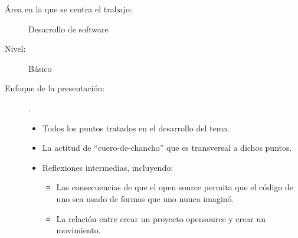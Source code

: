 \begin{description}
 \item[Área en la que se centra el trabajo:] Desarrollo de software
 \item[Nivel:] Básico
 \item[Enfoque de la presentación:] .\\
  \begin{itemize}
   \item Todos los puntos tratados en el desarrollo del tema.
   \item La actitud de ``cuero-de-chancho'' que es transversal a dichos puntos.
   \item Reflexiones intermedias, incluyendo:
     \begin{itemize}
     \item Las consecuencias de que el open source permita que el código de uno
       sea usado de formas que uno nunca imaginó.
     \item La relación entre crear un proyecto opensource y crear un movimiento.
     \end{itemize}
  \end{itemize}
\end{description}
